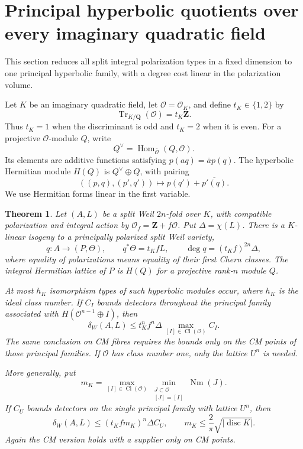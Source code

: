 \documentclass[11pt]{article}
\newtheorem{theorem}{Theorem}[section]
\theoremstyle{definition}
\theoremstyle{remark}
\newcommand{\Q}{\mathbf Q}
\newcommand{\Z}{\mathbf Z}
\begin{document}
\section{Principal hyperbolic quotients over every imaginary quadratic field}
\label{sec:principal-quotients}
This section reduces all split integral polarization types in a fixed dimension to one principal hyperbolic family, with a degree cost linear in the polarization volume.

Let $K$ be an imaginary quadratic field, let $\mathcal O=\mathcal O_K$, and define $t_K\in\{1,2\}$ by
\[
 \operatorname{Tr}_{K/\Q}(\mathcal O)=t_K\Z.
\]
Thus $t_K=1$ when the discriminant is odd and $t_K=2$ when it is even. For a projective $\mathcal O$-module $Q$, write
\[
 Q^\vee=\operatorname{Hom}_{\bar{\mathcal O}}(Q,\mathcal O).
\]
Its elements are additive functions satisfying $p(aq)=\bar a p(q)$. The hyperbolic Hermitian module $H(Q)$ is $Q^\vee\oplus Q$, with pairing
\[
 ((p,q),(p',q'))\longmapsto p(q')+\overline{p'(q)}.
\]
We use Hermitian forms linear in the first variable.

\begin{theorem}\label{thm:principal-quotient}
Let $(A,L)$ be a split Weil $2n$-fold over $K$, with compatible polarization and integral action by $\mathcal O_f=\Z+f\mathcal O$. Put $\Delta=\chi(L)$. There is a $K$-linear isogeny to a principally polarized split Weil variety,
\[
 q:A\longrightarrow(P,\Theta),\qquad
 q^*\Theta=t_K fL,\qquad
 \deg q=(t_K f)^{2n}\Delta,
\]
where equality of polarizations means equality of their first Chern classes. The integral Hermitian lattice of $P$ is $H(Q)$ for a projective rank-$n$ module $Q$.

At most $h_K$ isomorphism types of such hyperbolic modules occur, where $h_K$ is the ideal class number. If $C_I$ bounds detectors throughout the principal family associated with $H(\mathcal O^{n-1}\oplus I)$, then
\[
 \delta_W(A,L)\le t_K^n f^n\Delta\,
       \max_{[I]\in\operatorname{Cl}(\mathcal O)} C_I.
\]
The same conclusion on CM fibres requires the bounds only on the CM points of those principal families. If $\mathcal O$ has class number one, only the lattice $U^n$ is needed.

More generally, put
\[
 m_K=\max_{[I]\in\operatorname{Cl}(\mathcal O)}
       \min_{\substack{J\subset\mathcal O\\{[J]=[I]}}}
                    \operatorname{Nm}(J).
\]
If $C_U$ bounds detectors on the single principal family with lattice $U^n$, then
\[
 \delta_W(A,L)\le(t_Kfm_K)^n\Delta C_U,
 \qquad m_K\le\frac2\pi\sqrt{|\operatorname{disc}K|}.
\]
Again the CM version holds with a supplier only on CM points.
\end{theorem}
\end{document}
